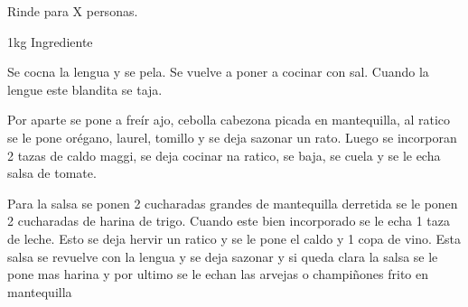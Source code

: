 
Rinde para X personas.


\begin{ingredientes}
\item 1kg Ingrediente
\end{ingredientes}
\preparacion
Se cocna la lengua y se pela. Se vuelve a poner a cocinar con sal. Cuando la lengue este blandita se taja.

Por aparte se pone a freír ajo, cebolla cabezona picada en mantequilla, al ratico se le pone orégano, laurel, tomillo y se deja sazonar un rato. Luego se incorporan 2 tazas de caldo maggi, se deja cocinar na ratico, se baja, se cuela y se le echa salsa de tomate.

Para la salsa se ponen 2 cucharadas grandes de mantequilla derretida se le ponen 2 cucharadas de harina de trigo. Cuando este bien incorporado se le echa 1 taza de leche. Esto se deja hervir un ratico y se le pone el caldo y 1 copa de vino. Esta salsa se revuelve con la lengua y se deja sazonar y si queda clara la salsa se le pone mas harina y por ultimo se le echan las arvejas o champiñones frito en mantequilla

